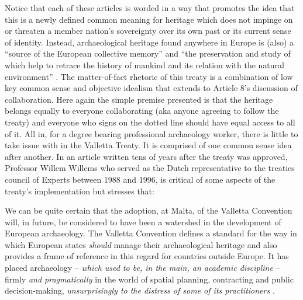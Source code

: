 Notice that each of these articles is worded in a way that promotes the idea that this is a newly defined common meaning for heritage which does not impinge on or threaten a member nation’s sovereignty over its own past or its current sense of identity. Instead, archaeological heritage found anywhere in Europe is (also) a “source of the European collective memory” and “the preservation and study of which help to retrace the history of mankind and its relation with the natural environment” \parencite[4]{Valletta_1992}. 
The matter-of-fact rhetoric of this treaty is a combination of low key common sense and objective idealism that extends to Article 8’s discussion of collaboration. Here again the simple premise presented is that the heritage belongs equally to everyone collaborating (aka anyone agreeing to follow the treaty) and everyone who signs on the dotted line should have equal access to all of it. All in, for a degree bearing professional archaeology worker, there is little to take issue with in the Valletta Treaty. It is comprised of one common sense idea after another. In an article written tens of years after the treaty was approved, Professor Willem Willems who served as the Dutch representative to the treaties council of Experts between 1988 and 1996, is critical of some aspects of the treaty’s implementation but stresses that:

\begin{displayquote}
	We can be quite certain that the adoption, at Malta, of the Valletta Convention will, in future, be considered to have been a watershed in the development of European archaeology. The Valletta Convention defines a standard for the way in which European states \textit{should} manage their archaeological heritage and also provides a frame of reference in this regard for countries outside Europe. It has placed archaeology – \textit{which used to be, in the main, an academic discipline} – firmly {\textit{and pragmatically}} in the world of spatial planning, contracting and public decision-making, \textit{unsurprisingly to the distress of some of its practitioners} \parencite{Willems_2007}.
\end{displayquote}

